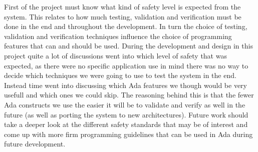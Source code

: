 First of the project must know what kind of safety level is expected from the
system. This relates to how much testing, validation and verification must
be done in the end and throughout the development. In turn the choice of
testing, validation and verification techniques influence the choice of
programming features that can and should be used. During the development and
design in this project quite a lot of discussions went into which level of
safety that was expected, as there were no specific application use in mind
there was no way to decide which techniques we were going to use to test the
system in the end. Instead time went into discussing which Ada features we
though would be very usefull and which ones we could skip. The reasoning behind
this is that the fewer Ada constructs we use the easier it will be to validate
and verify as well in the future (as well as porting the system to new
architectures). Future work should take a deeper look at the different safety
standards that may be of interest and come up with more firm programming
guidelines that can be used in Ada during future development.

%
% 
% 

